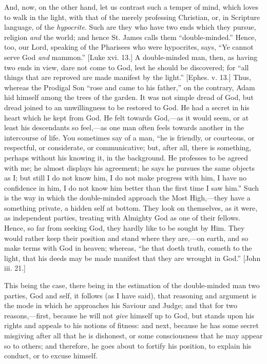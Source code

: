 And, now, on the other hand, let us contrast such a temper of mind,
which loves to walk in the light, with that of the merely professing
Christian, or, in Scripture language, of the \emph{hypocrite}. Such
are they who have two ends which they pursue, religion \emph{and} the
world; and hence St. James calls them ``double-minded.''
Hence, too, our Lord, speaking of the Pharisees who were hypocrites,
says, ``Ye cannot serve God \emph{and} mammon.'' [Luke xvi.
13.] A double-minded man, then, as having two ends in view, dare not
come to God, lest he should be discovered; for ``all things that
are reproved are made manifest by the light.'' [Ephes. v. 13.]
Thus, whereas the Prodigal Son ``rose and came to his
father,'' on the contrary, Adam hid himself among the trees of the
garden. It was not simple dread of God, but dread joined to an
unwillingness to be restored to God. He had a secret in his heart
which he kept from God. He felt towards God,—as it would seem, or at
least his descendants so feel,—as one man often feels towards
another in the intercourse of life. You sometimes say of a man,
``he is friendly, or courteous, or respectful, or considerate, or
communicative; but, after all, there is something, perhaps without his
knowing it, in the background. He professes to be agreed with me; he
almost displays his agreement; he says he pursues the same objects as
I; but still I do not know him, I do not make progress with him, I
have no confidence in him, I do not know him better than the first
time I saw him.'' Such is the way in which the double-minded
approach the Most High,—they have a something private, a hidden self
at bottom. They look on themselves, as it were, as independent
parties, treating with Almighty God as one of their fellows. Hence, so
far from seeking God, they hardly like to be sought by Him. They would
rather keep their position and stand where they are,—on earth, and
so make terms with God in heaven; whereas, ``he that doeth truth,
cometh to the light, that his deeds may be made manifest that they are
wrought in God.'' [John iii. 21.]

This being the case, there being in the estimation of the
double-minded man two parties, God and self, it follows (as I have
said), that reasoning and argument is the mode in which he approaches
his Saviour and Judge; and that for two reasons,—first, because he
will not \emph{give} himself up to God, but stands upon his rights and
appeals to his notions of fitness: and next, because he has some
secret misgiving after all that he is dishonest, or some consciousness
that he may appear so to others; and therefore, he goes about to
fortify his position, to explain his conduct, or to excuse himself.

